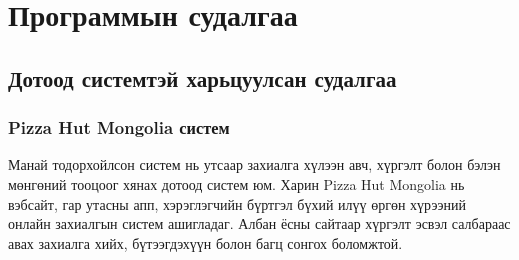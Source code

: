 \section{Программын судалгаа}
\subsection{Дотоод системтэй харьцуулсан судалгаа}

\subsubsection{Pizza Hut Mongolia систем}

Манай тодорхойлсон систем нь утсаар захиалга хүлээн авч, хүргэлт болон бэлэн мөнгөний тооцоог хянах дотоод систем юм. Харин Pizza Hut Mongolia нь вэбсайт, гар утасны апп, хэрэглэгчийн бүртгэл бүхий илүү өргөн хүрээний онлайн захиалгын систем ашигладаг. Албан ёсны сайтаар хүргэлт эсвэл салбараас авах захиалга хийх, бүтээгдэхүүн болон багц сонгох боломжтой.

